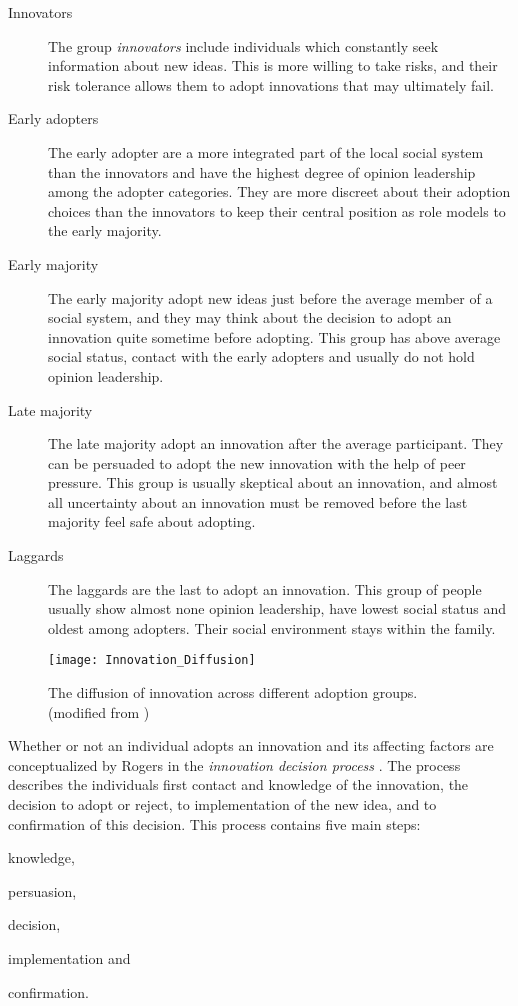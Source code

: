 \begin{description}
  \item[Innovators] The group \textit{innovators} include individuals which constantly seek information about new ideas. This is more willing to take risks, and their risk tolerance allows them to adopt innovations that may ultimately fail.
  \item[Early adopters] The early adopter are a more integrated part of the local social system than the innovators and have the highest degree of opinion leadership among the adopter categories. They are more discreet about their adoption choices than the innovators to keep their central position as role models to the early majority.
  \item[Early majority] The early majority adopt new ideas just before the average member of a social system, and they may think about the decision to adopt an innovation quite sometime before adopting. This group has above average social status, contact with the early adopters and usually do not hold opinion leadership.
  \item[Late majority] The late majority adopt an innovation after the average participant. They can be persuaded to adopt the new innovation with the help of peer pressure. This group is usually skeptical about an innovation, and almost all uncertainty about an innovation must be removed before the last majority feel safe about adopting.
  \item[Laggards] The laggards are the last to adopt an innovation. This group of people usually show almost none opinion leadership, have lowest social status and oldest among adopters. Their social environment stays within the family.
\end{description}

\begin{figure}[h]
  \centering
    \texttt{[image: Innovation\_Diffusion]}
  \caption{The diffusion of innovation across different adoption groups. (modified from \cite{Rogers1983})}
  \label{fig:Innovation_Diffusion}
\end{figure}

Whether or not an individual adopts an innovation and its affecting factors are conceptualized by Rogers in the \textit{innovation decision process} \cite{Rogers1983}. The process describes the individuals first contact and knowledge of the innovation, the decision to adopt or reject, to implementation of the new idea, and to confirmation of this decision. This process contains five main steps: \begin{enumerate*}[label=(\(\arabic*\))]
  \item knowledge,
  \item persuasion,
  \item decision,
  \item implementation and
  \item confirmation.
\end{enumerate*}


